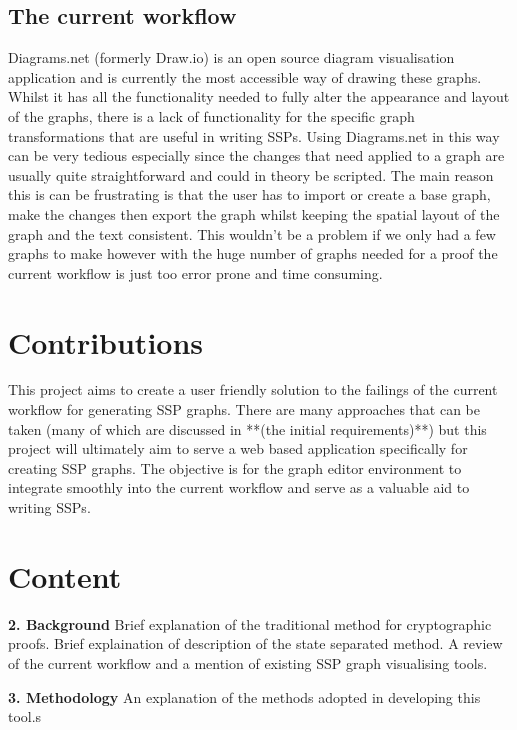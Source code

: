 \documentclass[bsc,frontabs,singlespacing,parskip,deptreport]{infthesis}
\newcommand{\chapsubhead}[1]{\vspace{0.5em}\textbf{\large #1 \vspace{0.5em}}}
\begin{document}
\subsection{The current workflow}

Diagrams.net (formerly Draw.io) is an open source diagram visualisation application and is currently the most accessible way of drawing these graphs. Whilst it has all the functionality needed to fully alter the appearance and layout of the graphs, there is a lack of functionality for the specific graph transformations that are useful in writing SSPs. Using Diagrams.net in this way can be very tedious especially since the changes that need applied to a graph are usually quite straightforward and could in theory be scripted. The main reason this is can be frustrating is that the user has to import or create a base graph, make the changes then export the graph whilst keeping the spatial layout of the graph and the text consistent. This wouldn't be a problem if we only had a few graphs to make however with the huge number of graphs needed for a proof the current workflow is just too error prone and time consuming. 


\section{Contributions}
This project aims to create a user friendly solution to the failings of the current workflow for generating SSP graphs. There are many approaches that can be taken (many of which are discussed in **(the initial requirements)**) but this project will ultimately aim to serve a web based application specifically for creating SSP graphs. The objective is for the graph editor environment to integrate smoothly into the current workflow and serve as a valuable aid to writing SSPs. 

\newpage
\section{Content}

\chapsubhead{2. Background}
\newline
Brief explanation of the traditional method for cryptographic proofs. Brief explaination of description of the state separated method. A review of the current workflow and a mention of existing SSP graph visualising tools.

\chapsubhead{3. Methodology}
\newline
An explanation of the methods adopted in developing this tool.s
\end{document}
